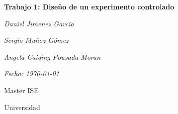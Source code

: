 \documentclass[a4paper,12pt]{article}
\begin{document}
\begin{titlepage}
    \centering
    \vspace*{3cm}
    {\Huge\bfseries Trabajo 1: Diseño de un experimento controlado \par}
    \vspace{2cm}
    {\Large\itshape Daniel Jimenez Garcia \par}
    {\Large\itshape Sergio Muñoz Gómez \par}
    {\Large\itshape Angela Caiqing Pousada Moran \par}
    \vspace{1cm}
    {\Large\itshape Fecha: \today \par}
    \vfill
    {\large Master ISE \par}
    {\large Universidad \par}
\end{titlepage}
\end{document}
